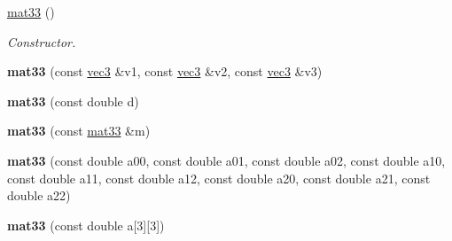 \begin{DoxyCompactItemize}
\item 
\hypertarget{classutil_1_1math_1_1mat33_a403a6779d3b01de177e57d47c1d979f3}{\hyperlink{classutil_1_1math_1_1mat33_a403a6779d3b01de177e57d47c1d979f3}{mat33} ()}\label{classutil_1_1math_1_1mat33_a403a6779d3b01de177e57d47c1d979f3}

\begin{DoxyCompactList}\small\item\em \-Constructor. \end{DoxyCompactList}\item 
\hypertarget{classutil_1_1math_1_1mat33_ab8e7b9217a0d8c0b9b179c44d3910851}{{\bfseries mat33} (const \hyperlink{classutil_1_1math_1_1vec3}{vec3} \&v1, const \hyperlink{classutil_1_1math_1_1vec3}{vec3} \&v2, const \hyperlink{classutil_1_1math_1_1vec3}{vec3} \&v3)}\label{classutil_1_1math_1_1mat33_ab8e7b9217a0d8c0b9b179c44d3910851}

\item 
\hypertarget{classutil_1_1math_1_1mat33_af61293c06efdb5e74ee9c224a68cd64c}{{\bfseries mat33} (const double d)}\label{classutil_1_1math_1_1mat33_af61293c06efdb5e74ee9c224a68cd64c}

\item 
\hypertarget{classutil_1_1math_1_1mat33_abe5a196ee8a813766123e5614eff325c}{{\bfseries mat33} (const \hyperlink{classutil_1_1math_1_1mat33}{mat33} \&m)}\label{classutil_1_1math_1_1mat33_abe5a196ee8a813766123e5614eff325c}

\item 
\hypertarget{classutil_1_1math_1_1mat33_a04df60084c74336543ece5286a093751}{{\bfseries mat33} (const double a00, const double a01, const double a02, const double a10, const double a11, const double a12, const double a20, const double a21, const double a22)}\label{classutil_1_1math_1_1mat33_a04df60084c74336543ece5286a093751}

\item 
\hypertarget{classutil_1_1math_1_1mat33_a84c33565f35fc3ab5bef208c3acdc9e0}{{\bfseries mat33} (const double a\mbox{[}3\mbox{]}\mbox{[}3\mbox{]})}\label{classutil_1_1math_1_1mat33_a84c33565f35fc3ab5bef208c3acdc9e0}

\end{DoxyCompactItemize}


